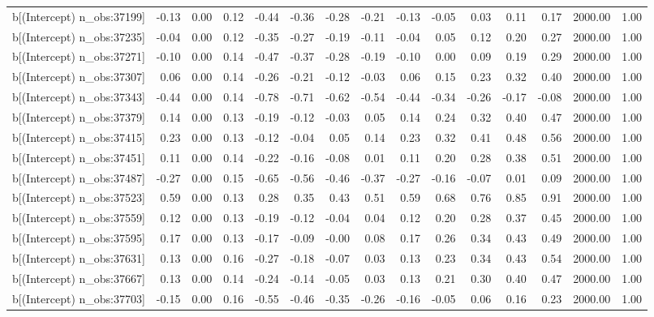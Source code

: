 \begin{table}[ht]
\begin{tabular}{rrrrrrrrrrrrrrr}
  b[(Intercept) n\_obs:37199] & -0.13 & 0.00 & 0.12 & -0.44 & -0.36 & -0.28 & -0.21 & -0.13 & -0.05 & 0.03 & 0.11 & 0.17 & 2000.00 & 1.00 \\ 
  b[(Intercept) n\_obs:37235] & -0.04 & 0.00 & 0.12 & -0.35 & -0.27 & -0.19 & -0.11 & -0.04 & 0.05 & 0.12 & 0.20 & 0.27 & 2000.00 & 1.00 \\ 
  b[(Intercept) n\_obs:37271] & -0.10 & 0.00 & 0.14 & -0.47 & -0.37 & -0.28 & -0.19 & -0.10 & 0.00 & 0.09 & 0.19 & 0.29 & 2000.00 & 1.00 \\ 
  b[(Intercept) n\_obs:37307] & 0.06 & 0.00 & 0.14 & -0.26 & -0.21 & -0.12 & -0.03 & 0.06 & 0.15 & 0.23 & 0.32 & 0.40 & 2000.00 & 1.00 \\ 
  b[(Intercept) n\_obs:37343] & -0.44 & 0.00 & 0.14 & -0.78 & -0.71 & -0.62 & -0.54 & -0.44 & -0.34 & -0.26 & -0.17 & -0.08 & 2000.00 & 1.00 \\ 
  b[(Intercept) n\_obs:37379] & 0.14 & 0.00 & 0.13 & -0.19 & -0.12 & -0.03 & 0.05 & 0.14 & 0.24 & 0.32 & 0.40 & 0.47 & 2000.00 & 1.00 \\ 
  b[(Intercept) n\_obs:37415] & 0.23 & 0.00 & 0.13 & -0.12 & -0.04 & 0.05 & 0.14 & 0.23 & 0.32 & 0.41 & 0.48 & 0.56 & 2000.00 & 1.00 \\ 
  b[(Intercept) n\_obs:37451] & 0.11 & 0.00 & 0.14 & -0.22 & -0.16 & -0.08 & 0.01 & 0.11 & 0.20 & 0.28 & 0.38 & 0.51 & 2000.00 & 1.00 \\ 
  b[(Intercept) n\_obs:37487] & -0.27 & 0.00 & 0.15 & -0.65 & -0.56 & -0.46 & -0.37 & -0.27 & -0.16 & -0.07 & 0.01 & 0.09 & 2000.00 & 1.00 \\ 
  b[(Intercept) n\_obs:37523] & 0.59 & 0.00 & 0.13 & 0.28 & 0.35 & 0.43 & 0.51 & 0.59 & 0.68 & 0.76 & 0.85 & 0.91 & 2000.00 & 1.00 \\ 
  b[(Intercept) n\_obs:37559] & 0.12 & 0.00 & 0.13 & -0.19 & -0.12 & -0.04 & 0.04 & 0.12 & 0.20 & 0.28 & 0.37 & 0.45 & 2000.00 & 1.00 \\ 
  b[(Intercept) n\_obs:37595] & 0.17 & 0.00 & 0.13 & -0.17 & -0.09 & -0.00 & 0.08 & 0.17 & 0.26 & 0.34 & 0.43 & 0.49 & 2000.00 & 1.00 \\ 
  b[(Intercept) n\_obs:37631] & 0.13 & 0.00 & 0.16 & -0.27 & -0.18 & -0.07 & 0.03 & 0.13 & 0.23 & 0.34 & 0.43 & 0.54 & 2000.00 & 1.00 \\ 
  b[(Intercept) n\_obs:37667] & 0.13 & 0.00 & 0.14 & -0.24 & -0.14 & -0.05 & 0.03 & 0.13 & 0.21 & 0.30 & 0.40 & 0.47 & 2000.00 & 1.00 \\ 
  b[(Intercept) n\_obs:37703] & -0.15 & 0.00 & 0.16 & -0.55 & -0.46 & -0.35 & -0.26 & -0.16 & -0.05 & 0.06 & 0.16 & 0.23 & 2000.00 & 1.00 \\ 

\end{tabular}
\end{table}
